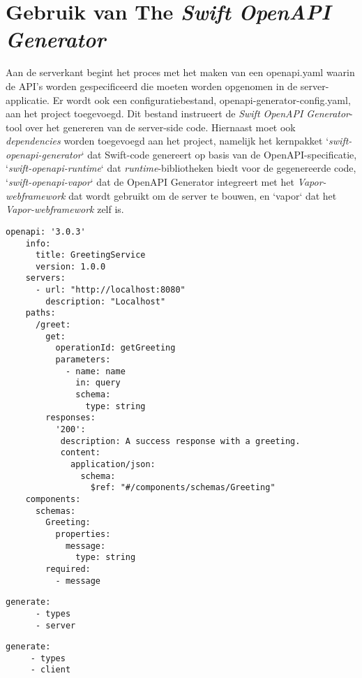 \section{Gebruik van The \textit{Swift OpenAPI Generator}}

Aan de serverkant begint het proces met het maken van een openapi.yaml waarin de API's worden gespecificeerd die moeten worden opgenomen in de server-\\applicatie. Er wordt ook een configuratiebestand, openapi-generator-config.yaml, aan het project toegevoegd. Dit bestand instrueert de \textit{Swift OpenAPI Generator}-tool over het genereren van de server-side code. Hiernaast moet ook \\\textit{dependencies} worden toegevoegd aan het project, namelijk het kernpakket `\textit{swift-openapi-generator}` dat Swift-code genereert op basis van de OpenAPI-specificatie, `\textit{swift-openapi-runtime}` dat \textit{runtime}-bibliotheken biedt voor de gegenereerde code, `\textit{swift-openapi-vapor}` dat de OpenAPI Generator integreert met het \textit{Vapor-webframework} dat wordt gebruikt om de server te bouwen, en `vapor` dat het \textit{Vapor-webframework} zelf is.

\begin{lstlisting}[caption=openapi.yml file]
    openapi: '3.0.3'
    info:
      title: GreetingService
      version: 1.0.0
    servers:
      - url: "http://localhost:8080"
        description: "Localhost"
    paths:
      /greet:
        get:
          operationId: getGreeting
          parameters:
            - name: name
              in: query
              schema:
                type: string
        responses:
          '200':
           description: A success response with a greeting.
           content:
             application/json:
               schema:
                 $ref: "#/components/schemas/Greeting"
    components:
      schemas:
        Greeting:
          properties:
            message:
              type: string
        required:
          - message
\end{lstlisting}

\begin{lstlisting}[caption=openapi-generator-config.yaml server file]
    generate:
      - types
      - server
\end{lstlisting}

\begin{lstlisting}[caption=openapi-generator-config.yaml client file]
   generate:
     - types
     - client
\end{lstlisting}

